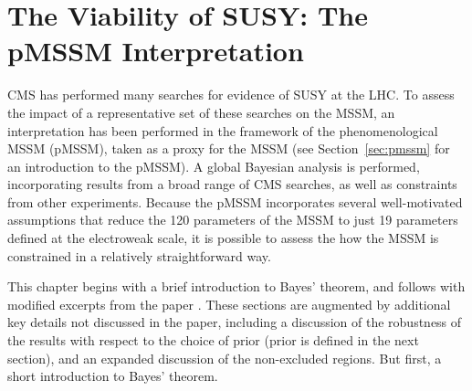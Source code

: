 \chapter{The Viability of SUSY: The pMSSM Interpretation}
\label{chap:run1pmssm}
CMS has performed many searches for evidence of SUSY at the LHC. To assess the impact of a representative set of these searches on the MSSM, an interpretation has been performed in the framework of the phenomenological MSSM (pMSSM), taken as a proxy for the MSSM (see Section~\ref{sec:pmssm} for an introduction to the pMSSM).  A global Bayesian analysis is performed, incorporating results from a broad range of CMS searches, as well as constraints from other experiments. Because the pMSSM incorporates several well-motivated assumptions that reduce the 120 parameters of the MSSM to just 19 parameters defined at the electroweak scale, it is possible to assess the how the MSSM is constrained in a relatively straightforward way. 

This chapter begins with a brief introduction to Bayes' theorem, and follows with modified excerpts from the paper \cite{Khachatryan:2016nvf}. These sections are augmented by additional key details not discussed in the paper, including a discussion of the robustness of the results with respect to the choice of prior (prior is defined in the next section), and an expanded discussion of the non-excluded regions. But first, a short introduction to Bayes' theorem.

